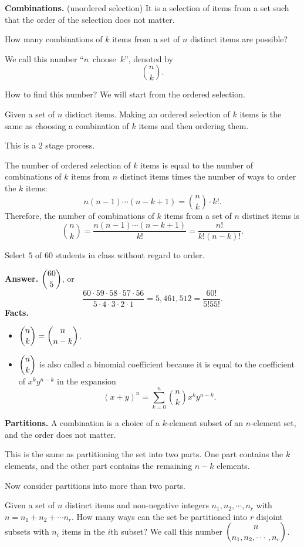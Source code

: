   \textbf{Combinations.} (unordered selection) It is a selection of items from a
  set such that the order of the selection does not matter.

  How many combinations of $k$ items from a set of $n$ distinct items are
  possible?

  We call this number ``$n$~choose~$k$'', denoted by
  \[
    \binom{n}{k}.
  \]

  How to find this number? We will start from the ordered selection.
  
  Given a set of $n$ distinct items. Making an ordered selection of $k$ items is
  the same as choosing a combination of $k$ items and then ordering them.

  This is a $2$ stage process.

  The number of ordered selection of $k$ items is equal to the number of
  combinations of $k$ items from $n$ distinct items times the number of ways to
  order the $k$ items:
  \[
    n(n-1)\cdots(n-k+1) = \binom{n}{k}\cdot k!.
  \]
  Therefore, the number of combinations of $k$ items from a set of $n$ distinct
  items is
  \[
    \binom{n}{k} = \frac{n(n-1)\cdots (n-k+1)}{k!} = \frac{n!}{k!(n-k)!}.
  \]
  
  \begin{example}
    Select $5$ of $60$ students in class without regard to order.
  \end{example}
  \textbf{Answer.} $\displaystyle\binom{60}{5}$, or
  \[
    \frac{60\cdot 59\cdot 58 \cdot 57 \cdot 56}{5\cdot 4 \cdot 3\cdot 2\cdot 1}
    = 5,461,512 = \frac{60!}{5!55!}.
  \]
  \textbf{Facts.}
  \begin{itemize}
  \item $\displaystyle\binom{n}{k} = \binom{n}{n-k}$.
  \item $\displaystyle\binom{n}{k}$ is also called a binomial coefficient because it is equal
    to the coefficient of $x^ky^{n-k}$ in the expansion
    \[
      (x+y)^n = \sum_{k=0}^n \binom{n}{k}x^k y^{n-k}.
    \]
  \end{itemize}

  \textbf{Partitions.} A combination is a choice of a $k$-element subset of an
  $n$-element set, and the order does not matter.

  This is the same as partitioning the set into two parts. One part contains the
  $k$ elements, and the other part contains the remaining $n-k$ elements.

  Now consider partitions into more than two parts.

  Given a set of $n$ distinct items and non-negative integers $n_1, n_2,\cdots,
  n_r$ with $n=n_1+n_2+\cdots n_r$. How many ways can the set be partitioned
  into $r$ disjoint subsets with $n_i$ items in the $i$th subset? We call this
  number $\displaystyle \binom{n}{n_1,n_2,\cdots,n_r}$.

